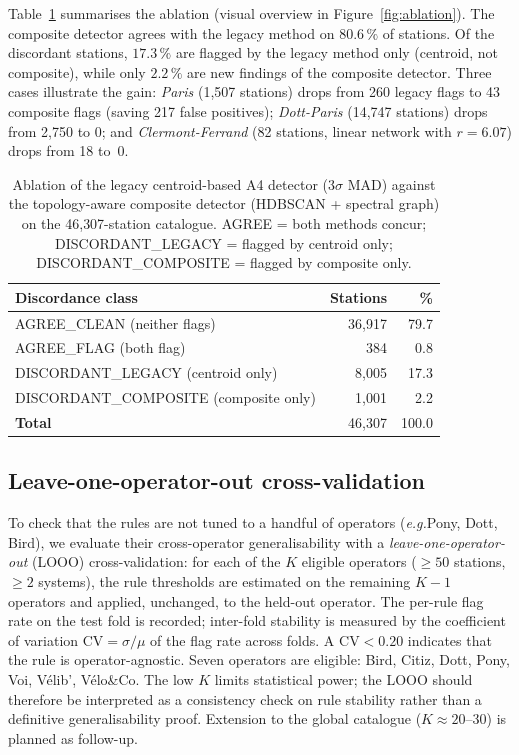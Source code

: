 \documentclass[11pt,a4paper]{article}
\newcommand{\eg}{\emph{e.g.}}
\begin{document}
Table~\ref{tab:ablation} summarises the ablation (visual overview in
Figure~\ref{fig:ablation}). The composite detector agrees with the
legacy method on $80.6\,\%$ of stations.
Of the discordant stations, $17.3\,\%$ are flagged by the
legacy method only (centroid, not composite), while only
$2.2\,\%$ are new findings of the composite detector. Three cases
illustrate the gain: \emph{Paris} (1{,}507 stations) drops from 260
legacy flags to 43 composite flags (saving 217 false positives);
\emph{Dott-Paris} (14{,}747 stations) drops from 2{,}750 to 0; and
\emph{Clermont-Ferrand} (82 stations, linear network with $r = 6.07$)
drops from 18 to~0.

\begin{table}[!htbp]
\centering
\caption{Ablation of the legacy centroid-based A4 detector (3$\sigma$
MAD) against the topology-aware composite detector (HDBSCAN +
spectral graph) on the 46{,}307-station catalogue. AGREE = both
methods concur; DISCORDANT\_LEGACY = flagged by centroid only;
DISCORDANT\_COMPOSITE = flagged by composite only.}
\label{tab:ablation}
\small
\begin{tabular}{@{}lrr@{}}
\toprule
\textbf{Discordance class} & \textbf{Stations} & \textbf{\%}\\
\midrule
AGREE\_CLEAN (neither flags) & 36{,}917 & 79.7 \\
AGREE\_FLAG (both flag)      &    384 &  0.8 \\
DISCORDANT\_LEGACY (centroid only)   &  8{,}005 & 17.3 \\
DISCORDANT\_COMPOSITE (composite only) & 1{,}001 &  2.2 \\
\midrule
\textbf{Total}               & 46{,}307 & 100.0 \\
\bottomrule
\end{tabular}
\end{table}


\subsection{Leave-one-operator-out cross-validation}\label{secLOOO}
To check that the rules are not tuned to a handful of operators
(\eg Pony, Dott, Bird), we evaluate their cross-operator
generalisability with a \emph{leave-one-operator-out} (LOOO)
cross-validation: for each of the $K$ eligible operators
($\ge 50$ stations, $\ge 2$ systems), the rule thresholds are
estimated on the remaining $K-1$ operators and applied, unchanged,
to the held-out operator. The per-rule flag rate on the test fold
is recorded; inter-fold stability is measured by the coefficient of
variation $\mathrm{CV} = \sigma / \mu$ of the flag rate across folds.
A $\mathrm{CV} < 0.20$ indicates that the rule is operator-agnostic.
Seven operators are eligible: Bird, Citiz, Dott, Pony, Voi, V\'elib',
V\'elo\&Co. The low $K$ limits statistical power; the LOOO should
therefore be interpreted as a consistency check on rule stability
rather than a definitive generalisability proof. Extension to the
global catalogue ($K \approx 20$--$30$) is planned as follow-up.
\end{document}
